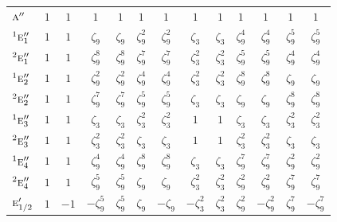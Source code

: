 \documentclass[10pt,a4paper]{article}
\makeatletter
\def\grouprule#1#2{\noalign{\marks\LTgroupmarks{\the\belowrulesep}\nobreak\vskip#1%
  \vskip\aboverulesep}\multispan\LT@cols\unskip{\leaders\hrule\@height#2\hfill\kern\z@}\cr
  \noalign{\penalty\LTrulebreak\vskip\belowrulesep\global\@lastruleclass\z@}}
\numberwithin{equation}{section}
\newcommand{\irr}[1]{\text{\normalfont\scshape #1}}
\newcommand{\conjpair}[1]{{}^{#1}}
\newcommand{\rootunity}[1]{\zeta_{#1}}
\makeatother
\begin{document}
{\begin{longtable}{@{}lcccccccccccc@{}}
$\irr{a}''$ & $1$ & $1$ & $1$ & $1$ & $1$ & $1$ & $1$ & $1$ & $1$ & $1$ & $1$ & $1$\\
$\conjpair{1}\irr{e}_{1}''$ & $1$ & $1$ & $\rootunity{9}$ & $\rootunity{9}$ & $\rootunity{9}^{2}$ & $\rootunity{9}^{2}$ & $\rootunity{3}$ & $\rootunity{3}$ & $\rootunity{9}^{4}$ & $\rootunity{9}^{4}$ & $\rootunity{9}^{5}$ & $\rootunity{9}^{5}$\\
$\conjpair{2}\irr{e}_{1}''$ & $1$ & $1$ & $\rootunity{9}^{8}$ & $\rootunity{9}^{8}$ & $\rootunity{9}^{7}$ & $\rootunity{9}^{7}$ & $\rootunity{3}^{2}$ & $\rootunity{3}^{2}$ & $\rootunity{9}^{5}$ & $\rootunity{9}^{5}$ & $\rootunity{9}^{4}$ & $\rootunity{9}^{4}$\\
$\conjpair{1}\irr{e}_{2}''$ & $1$ & $1$ & $\rootunity{9}^{2}$ & $\rootunity{9}^{2}$ & $\rootunity{9}^{4}$ & $\rootunity{9}^{4}$ & $\rootunity{3}^{2}$ & $\rootunity{3}^{2}$ & $\rootunity{9}^{8}$ & $\rootunity{9}^{8}$ & $\rootunity{9}$ & $\rootunity{9}$\\
$\conjpair{2}\irr{e}_{2}''$ & $1$ & $1$ & $\rootunity{9}^{7}$ & $\rootunity{9}^{7}$ & $\rootunity{9}^{5}$ & $\rootunity{9}^{5}$ & $\rootunity{3}$ & $\rootunity{3}$ & $\rootunity{9}$ & $\rootunity{9}$ & $\rootunity{9}^{8}$ & $\rootunity{9}^{8}$\\
$\conjpair{1}\irr{e}_{3}''$ & $1$ & $1$ & $\rootunity{3}$ & $\rootunity{3}$ & $\rootunity{3}^{2}$ & $\rootunity{3}^{2}$ & $1$ & $1$ & $\rootunity{3}$ & $\rootunity{3}$ & $\rootunity{3}^{2}$ & $\rootunity{3}^{2}$\\
$\conjpair{2}\irr{e}_{3}''$ & $1$ & $1$ & $\rootunity{3}^{2}$ & $\rootunity{3}^{2}$ & $\rootunity{3}$ & $\rootunity{3}$ & $1$ & $1$ & $\rootunity{3}^{2}$ & $\rootunity{3}^{2}$ & $\rootunity{3}$ & $\rootunity{3}$\\
$\conjpair{1}\irr{e}_{4}''$ & $1$ & $1$ & $\rootunity{9}^{4}$ & $\rootunity{9}^{4}$ & $\rootunity{9}^{8}$ & $\rootunity{9}^{8}$ & $\rootunity{3}$ & $\rootunity{3}$ & $\rootunity{9}^{7}$ & $\rootunity{9}^{7}$ & $\rootunity{9}^{2}$ & $\rootunity{9}^{2}$\\
$\conjpair{2}\irr{e}_{4}''$ & $1$ & $1$ & $\rootunity{9}^{5}$ & $\rootunity{9}^{5}$ & $\rootunity{9}$ & $\rootunity{9}$ & $\rootunity{3}^{2}$ & $\rootunity{3}^{2}$ & $\rootunity{9}^{2}$ & $\rootunity{9}^{2}$ & $\rootunity{9}^{7}$ & $\rootunity{9}^{7}$\\
\grouprule{0pt}{\lightrulewidth}
$\irr{e}_{1/2}'$ & $1$ & $-1$ & $-\rootunity{9}^{5}$ & $\rootunity{9}^{5}$ & $\rootunity{9}$ & $-\rootunity{9}$ & $-\rootunity{3}^{2}$ & $\rootunity{3}^{2}$ & $\rootunity{9}^{2}$ & $-\rootunity{9}^{2}$ & $\rootunity{9}^{7}$ & $-\rootunity{9}^{7}$\\

\end{longtable}}
\end{document}
